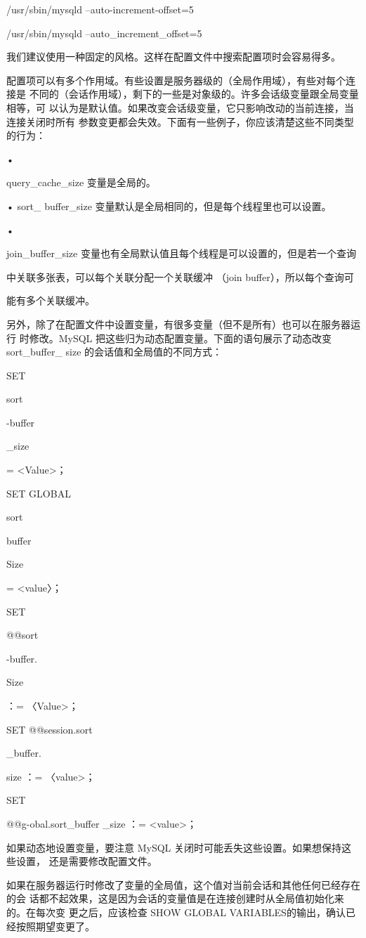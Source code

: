 /usr/sbin/mysqld --auto-increment-offset=5

/usr/sbin/mysqld --auto\_increment\_offset=5

我们建议使用一种固定的风格。这样在配置文件中搜索配置项时会容易得多。

配置项可以有多个作用域。有些设置是服务器级的（全局作用域），有些对每个连接是
不同的（会话作用域），剩下的一些是对象级的。许多会话级变量跟全局变量相等，可
以认为是默认值。如果改变会话级变量，它只影响改动的当前连接，当连接关闭时所有
参数变更都会失效。下面有一些例子，你应该清楚这些不同类型的行为：

•

query\_cache\_size 变量是全局的。

• sort\_ buffer\_size 变量默认是全局相同的，但是每个线程里也可以设置。

•

join\_buffer\_size 变量也有全局默认值且每个线程是可以设置的，但是若一个查询

中关联多张表，可以每个关联分配一个关联缓冲 （join buffer），所以每个查询可

能有多个关联缓冲。

另外，除了在配置文件中设置变量，有很多变量（但不是所有）也可以在服务器运行
时修改。MySQL 把这些归为动态配置变量。下面的语句展示了动态改变 sort\_buffer\_
size 的会话值和全局值的不同方式：

SET

sort

-buffer

\_size

= <Value>；

SET GLOBAL

sort

buffer

Size

= <value〉；

SET

@@sort

-buffer.

Size

：= 〈Value>；

SET @@session.sort

\_buffer.

size ：= 〈value>；

SET

@@g-obal.sort\_buffer \_size ：= <value>；

如果动态地设置变量，要注意 MySQL 关闭时可能丢失这些设置。如果想保持这些设置，
还是需要修改配置文件。

如果在服务器运行时修改了变量的全局值，这个值对当前会话和其他任何已经存在的会
话都不起效果，这是因为会话的变量值是在连接创建时从全局值初始化来的。在每次变
更之后，应该检查 SHOW GLOBAL VARIABLES的输出，确认已经按照期望变更了。

